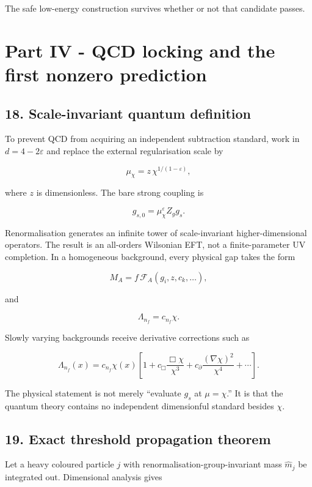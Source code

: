 \documentclass[
]{article}
\begin{document}
The safe low-energy construction survives whether or not that candidate
passes.

\section{Part IV - QCD locking and the first nonzero
prediction}\label{part-iv---qcd-locking-and-the-first-nonzero-prediction}

\subsection{18. Scale-invariant quantum
definition}\label{scale-invariant-quantum-definition}

To prevent QCD from acquiring an independent subtraction standard, work
in \(d=4-2\varepsilon\) and replace the external regularisation scale by

\[
\mu_\chi=z\,\chi^{1/(1-\varepsilon)},
\]

where \(z\) is dimensionless. The bare strong coupling is

\[
g_{s,0}=\mu_\chi^\varepsilon Z_g g_s.
\]

Renormalisation generates an infinite tower of scale-invariant
higher-dimensional operators. The result is an all-orders Wilsonian EFT,
not a finite-parameter UV completion. In a homogeneous background, every
physical gap takes the form

\[
M_A=f\,\mathcal F_A(g_i,z,c_k,\ldots),
\]

and

\[
\Lambda_{n_f}=c_{n_f}\chi.
\]

Slowly varying backgrounds receive derivative corrections such as

\[
\Lambda_{n_f}(x)=c_{n_f}\chi(x)
\left[1+c_\Box\frac{\Box\chi}{\chi^3}
+c_\partial\frac{(\nabla\chi)^2}{\chi^4}+\cdots\right].
\]

The physical statement is not merely ``evaluate \(g_s\) at
\(\mu=\chi\).'' It is that the quantum theory contains no independent
dimensionful standard besides \(\chi\).

\subsection{19. Exact threshold propagation
theorem}\label{exact-threshold-propagation-theorem}

Let a heavy coloured particle \(j\) with renormalisation-group-invariant
mass \(\widehat m_j\) be integrated out. Dimensional analysis gives
\end{document}
